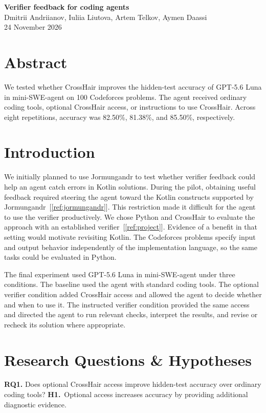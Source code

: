 \documentclass[11pt,a4paper]{article}
\begin{document}
\begin{center}
{\LARGE\bfseries Verifier feedback for coding agents}\\[8pt]
Dmitrii Andriianov, Iuliia Liutova, Artem Telkov, Aymen Daassi\\[2pt]
24 November 2026
\end{center}

\section{Abstract}
We tested whether CrossHair improves the hidden-test accuracy of GPT-5.6 Luna in mini-SWE-agent on 100 Codeforces problems. The agent received ordinary coding tools, optional CrossHair access, or instructions to use CrossHair. Across eight repetitions, accuracy was 82.50\%, 81.38\%, and 85.50\%, respectively.

\section{Introduction}
We initially planned to use Jormungandr to test whether verifier feedback could help an agent catch errors in Kotlin solutions. During the pilot, obtaining useful feedback required steering the agent toward the Kotlin constructs supported by Jormungandr~[\ref{ref:jormungandr}]. This restriction made it difficult for the agent to use the verifier productively. We chose Python and CrossHair to evaluate the approach with an established verifier~[\ref{ref:project}]. Evidence of a benefit in that setting would motivate revisiting Kotlin. The Codeforces problems specify input and output behavior independently of the implementation language, so the same tasks could be evaluated in Python.

The final experiment used GPT-5.6 Luna in mini-SWE-agent under three conditions. The baseline used the agent with standard coding tools. The optional verifier condition added CrossHair access and allowed the agent to decide whether and when to use it. The instructed verifier condition provided the same access and directed the agent to run relevant checks, interpret the results, and revise or recheck its solution where appropriate.

\section{Research Questions \& Hypotheses}
\textbf{RQ1.} Does optional CrossHair access improve hidden-test accuracy over ordinary coding tools?\newline
\textbf{H1.}~Optional access increases accuracy by providing additional diagnostic evidence.
\end{document}
